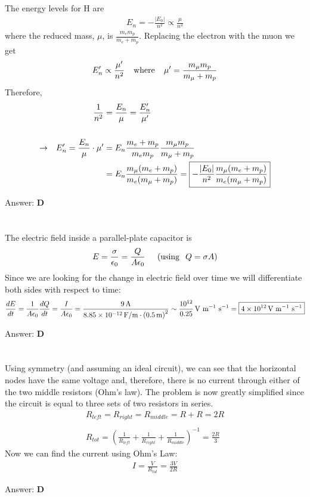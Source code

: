 \documentclass[12pt]{article}
\newcommand{\Answer}[1]{Answer: \textbf{#1}}
\newcommand{\Problem}[3]{
    \setcounter{section}{#1}
    \addtocounter{section}{-1}
    \section{}
    #3\par\par
    \Answer{#2}
}
\begin{document}
\Problem{66}{D}{%
The energy levels for H are
\begin{align}
E_{n} = - \frac{\left| E_{0} \right|}{n^2} \propto \frac{\mu}{n^{2}}
\end{align}
where the reduced mass, $\mu$, is  $\frac{m_{e} m_{p}}{m_{e} + m_{p}}$. Replacing the electron with the muon we get
\begin{gather}
E'_{n} \propto \frac{\mu'}{n^{2}}\hspace{.15 in} \text{where} \hspace{.15 in}  \mu' = \frac{m_{\mu} m_{p}}{m_{\mu} + m_{p}}\nonumber
\end{gather}
Therefore,
\begin{align}
\frac{1}{n^{2}} &= \frac{E_{n}}{\mu} = \frac{E'_{n}}{\mu'}\nonumber\\
\nonumber\\
\rightarrow \hspace{.1in} E'_{n} = \frac{E_{n}}{\mu} \cdot \mu' &= E_{n} \frac{m_{e} + m_{p}} {m_{e} m_{p}}   \frac{m_{\mu} m_{p}} {m_{\mu} + m_{p}}\nonumber\\
&= E_{n} \frac{m_{\mu} (m_{e} + m_{p})}{m_{e} (m_{\mu} + m_{p})} = \boxed{-\frac{|E_{0}|}{n^{2}} \frac{m_{\mu} (m_{e} + m_{p})}{m_{e} (m_{\mu} + m_{p})}}\nonumber
\end{align}
}


\Problem{67}{D}{%
The electric field inside a parallel-plate capacitor is
\begin{align}
E = \frac{\sigma}{\epsilon_{0}} = \frac{Q}{A \epsilon_{0}} \hspace{.2 in} (\text{using} \hspace{.1 in} Q = \sigma A)\nonumber
\end{align}
Since we are looking for the change in electric field over time we will differentiate both sides with respect to time:
\begin{align}
\frac{d E}{d t} = \frac{1}{A \epsilon_{0}} \frac{d Q}{d t} = \frac{I}{A \epsilon_{0}} =
\frac{9\,\text{A}}{8.85\times 10^{-12}\,\text{F/m} \cdot {(0.5\,\text{m})}^{2}} \sim \frac{10^{12}}{0.25}\,\text{V m$^{-1}$ s$^{-1}$} =
\boxed{4\times 10^{12}\,\text{V m$^{-1}$ s$^{-1}$}}\nonumber
\end{align}
}

\Problem{68}{D}{%
Using symmetry (and assuming an ideal circuit), we can see that the  horizontal nodes have the same voltage and, therefore, there is no current through either of the two middle resistors (Ohm's law). The problem is now greatly simplified since the circuit is equal to three sets of two resistors in series.
\begin{gather}
R_{left} = R_{right} = R_{middle} = R + R = 2R\nonumber\\
\nonumber\\
R_{tot} = \left( \frac{1}{R_{left}} + \frac{1}{R_{right}} + \frac{1}{R_{middle}} \right)^{-1} = \frac{2R}{3}\nonumber
\end{gather}
Now we can find the current using Ohm's Law:
\begin{align}
I = \frac{V}{R_{tot}} = \boxed{\frac{3V}{2R}}\nonumber
\end{align}
}
\end{document}
